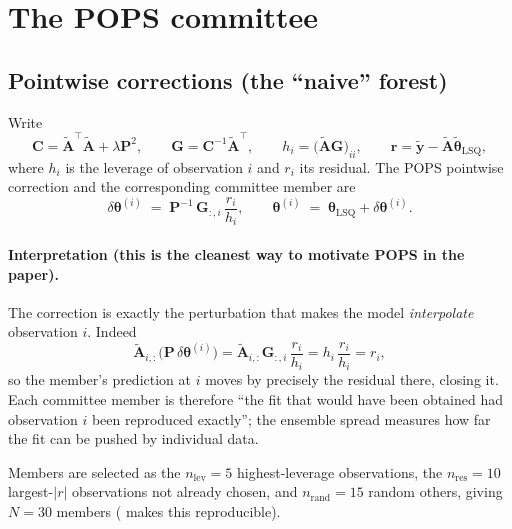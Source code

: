 \documentclass[11pt,a4paper]{article}
\newcommand{\jl}[1]{\path{#1}}
\begin{document}
\section{The POPS committee}
\label{sec:pops}

\subsection{Pointwise corrections (the ``naive'' forest)}

Write
\begin{equation}
\bm C = \tilde{\bm A}^{\!\top}\tilde{\bm A}+\lambda\bm P^{2},\qquad
\bm G = \bm C^{-1}\tilde{\bm A}^{\!\top},\qquad
h_i = \big(\tilde{\bm A}\bm G\big)_{ii},\qquad
\bm r = \tilde{\bm y}-\tilde{\bm A}\tilde{\bm\theta}_{\mathrm{LSQ}} ,
\label{eq:levres}
\end{equation}
where $h_i$ is the leverage of observation $i$ and $r_i$ its residual. The POPS
pointwise correction and the corresponding committee member are
\begin{equation}
\boxed{\;
\delta\bm\theta^{(i)} \;=\; \bm P^{-1}\,\bm G_{:,i}\,\frac{r_i}{h_i},
\qquad
\bm\theta^{(i)} \;=\; \bm\theta_{\mathrm{LSQ}} + \delta\bm\theta^{(i)} . \;}
\label{eq:pops}
\end{equation}

\paragraph{Interpretation (this is the cleanest way to motivate POPS in the paper).}
The correction is exactly the perturbation that makes the model \emph{interpolate}
observation $i$. Indeed
\begin{equation}
\tilde{\bm A}_{i,:}\big(\bm P\,\delta\bm\theta^{(i)}\big)
=\tilde{\bm A}_{i,:}\bm G_{:,i}\,\frac{r_i}{h_i}
= h_i\,\frac{r_i}{h_i}
= r_i ,
\label{eq:interp}
\end{equation}
so the member's prediction at $i$ moves by precisely the residual there, closing it.
Each committee member is therefore ``the fit that would have been obtained had
observation $i$ been reproduced exactly''; the ensemble spread measures how far the fit
can be pushed by individual data.

Members are selected as the $n_{\mathrm{lev}}=5$ highest-leverage observations, the
$n_{\mathrm{res}}=10$ largest-$|r|$ observations not already chosen, and
$n_{\mathrm{rand}}=15$ random others, giving $N=30$ members
(\jl{Random.seed!(1234)} makes this reproducible).
\end{document}
